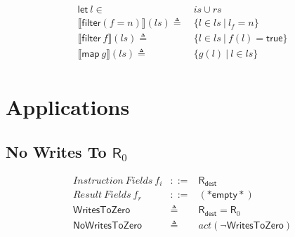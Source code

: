 \documentclass[12pt, letterpaper]{article}
\newcommand\interp[1]{\llbracket #1 \rrbracket}
\begin{document}
    \begin{align*}
        \mathsf{let}\ l \in\ & is\cup rs\\
        \interp{\mathsf{filter}(f=n)}(ls)
            \triangleq\ & \{l \in ls\ |\ l_f = n\}\\
        \interp{\mathsf{filter}\ f}(ls)
            \triangleq\ & \{l \in ls\ |\ f(l) = \mathsf{true}\}\\
        \interp{\mathsf{map}\ g}(ls)
            \triangleq\ &
            \{ g(l)\ |\ l\in ls \} \\
    \end{align*}

\section{Applications}

\subsection{No Writes To $\mathsf{R}_0$}

 \[
 \begin{array}{rcl}
   \mathit{Instruction\ Fields}\ f_i &::=& \mathsf{R}_{\mathsf{dest}} \\
   \mathit{Result\ Fields}\ f_r &::=& \mathsf{(*empty*)}\\
   \mathsf{WritesToZero} &\triangleq& \mathsf{R}_{\mathsf{dest}} = \mathsf{R}_0 \\
   \mathsf{NoWritesToZero} &\triangleq& \mathit{act}(\neg\mathsf{WritesToZero})
 \end{array}
 \]%
 
\end{document}
